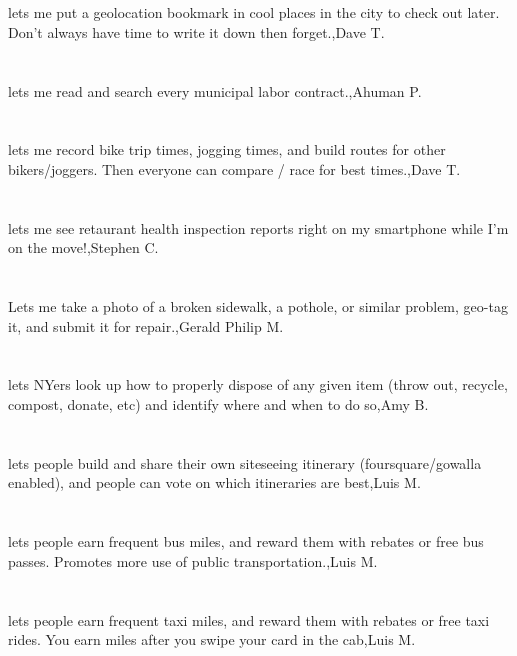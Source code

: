 \section{}lets me put a geolocation bookmark in cool places in the city to check out later. Don't always have time to write it down then forget.,Dave T.	
\section{}lets me read and search every municipal labor contract.,Ahuman P.	
\section{}lets me record bike trip times, jogging times, and build routes for other bikers/joggers. Then everyone can compare / race for best times.,Dave T.	
\section{}lets me see retaurant health inspection reports right on my smartphone while I'm on the move!,Stephen C.	
\section{}Lets me take a photo of a broken sidewalk, a pothole, or similar problem, geo-tag it, and submit it for repair.,Gerald Philip M.	
\section{}lets NYers look up how to properly dispose of any given item (throw out, recycle, compost, donate, etc) and identify where and when to do so,Amy B.	
\section{}  lets people build and share their own siteseeing itinerary (foursquare/gowalla enabled), and people can vote on which itineraries are best,Luis M.	
\section{}lets people earn frequent bus miles, and reward them with rebates or free bus passes. Promotes more use of public transportation.,Luis M.	
\section{}lets people earn frequent taxi miles, and reward them with rebates or free taxi rides. You earn miles after you swipe your card in the cab,Luis M.	
